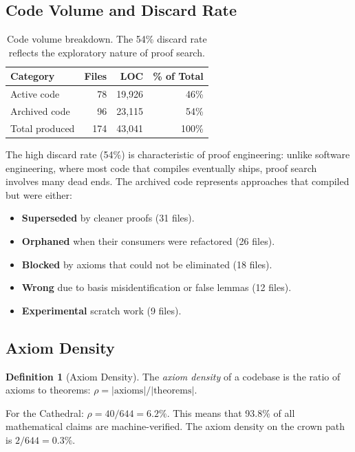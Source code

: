 \documentclass[11pt,a4paper]{article}
\theoremstyle{definition}
\newtheorem{definition}{Definition}[section]
\begin{document}
\subsection{Code Volume and Discard Rate}

\begin{table}[h]
\centering
\begin{tabular}{@{}lrrr@{}}
\toprule
\textbf{Category} & \textbf{Files} & \textbf{LOC} & \textbf{\% of Total} \\
\midrule
Active code & 78 & 19,926 & 46\% \\
Archived code & 96 & 23,115 & 54\% \\
\midrule
Total produced & 174 & 43,041 & 100\% \\
\bottomrule
\end{tabular}
\caption{Code volume breakdown. The 54\% discard rate reflects the
exploratory nature of proof search.}
\label{tab:volume}
\end{table}

The high discard rate (54\%) is characteristic of proof engineering:
unlike software engineering, where most code that compiles eventually
ships, proof search involves many dead ends. The archived code
represents approaches that compiled but were either:

\begin{itemize}
  \item \textbf{Superseded} by cleaner proofs (31 files).
  \item \textbf{Orphaned} when their consumers were refactored (26 files).
  \item \textbf{Blocked} by axioms that could not be eliminated (18 files).
  \item \textbf{Wrong} due to basis misidentification or false lemmas (12 files).
  \item \textbf{Experimental} scratch work (9 files).
\end{itemize}

\subsection{Axiom Density}

\begin{definition}[Axiom Density]
The \emph{axiom density} of a codebase is the ratio of axioms to
theorems: $\rho = |\text{axioms}| / |\text{theorems}|$.
\end{definition}

For the Cathedral: $\rho = 40 / 644 = 6.2\%$. This means that
93.8\% of all mathematical claims are machine-verified. The axiom
density on the crown path is $2 / 644 = 0.3\%$.
\end{document}
